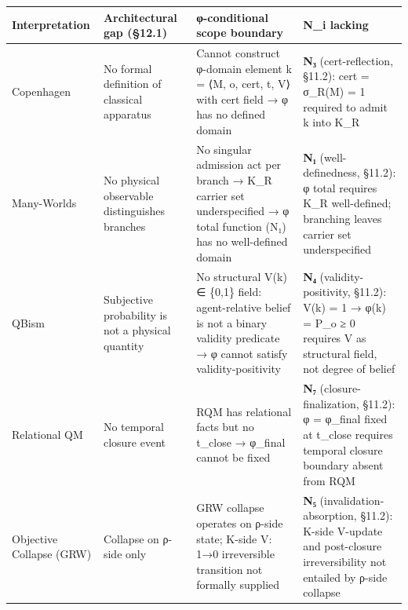 \documentclass[
  11pt,
]{article}
\newcounter{none} %
\begin{document}
{\def\LTcaptype{none} %
\begin{longtable}[]{@{}
  >{\raggedright\arraybackslash}p{}
  >{\raggedright\arraybackslash}p{}
  >{\raggedright\arraybackslash}p{}
  >{\raggedright\arraybackslash}p{}@{}}
\toprule\noalign{}
\begin{minipage}[b]{\linewidth}\raggedright
Interpretation
\end{minipage} & \begin{minipage}[b]{\linewidth}\raggedright
Architectural gap (§12.1)
\end{minipage} & \begin{minipage}[b]{\linewidth}\raggedright
φ-conditional scope boundary
\end{minipage} & \begin{minipage}[b]{\linewidth}\raggedright
N\_i lacking
\end{minipage} \\
\midrule\noalign{}
\endhead
\bottomrule\noalign{}
\endlastfoot
Copenhagen & No formal definition of classical apparatus & Cannot
construct φ-domain element k = ⟨M, o, cert, t, V⟩ with cert field → φ
has no defined domain & \textbf{N₃} (cert-reflection, §11.2): cert =
σ\_R(M) = 1 required to admit k into K\_R \\
Many-Worlds & No physical observable distinguishes branches & No
singular admission act per branch → K\_R carrier set underspecified → φ
total function (N₁) has no well-defined domain & \textbf{N₁}
(well-definedness, §11.2): φ total requires K\_R well-defined; branching
leaves carrier set underspecified \\
QBism & Subjective probability is not a physical quantity & No
structural V(k) ∈ \{0,1\} field: agent-relative belief is not a binary
validity predicate → φ cannot satisfy validity-positivity & \textbf{N₄}
(validity-positivity, §11.2): V(k) = 1 → φ(k) = P\_o ≥ 0 requires V as
structural field, not degree of belief \\
Relational QM & No temporal closure event & RQM has relational facts but
no t\_close → φ\_final cannot be fixed & \textbf{N₇}
(closure-finalization, §11.2): φ = φ\_final fixed at t\_close requires
temporal closure boundary absent from RQM \\
Objective Collapse (GRW) & Collapse on ρ-side only & GRW collapse
operates on ρ-side state; K-side V: 1→0 irreversible transition not
formally supplied & \textbf{N₅} (invalidation-absorption, §11.2): K-side
V-update and post-closure irreversibility not entailed by ρ-side
collapse \\
\end{longtable}
}
\end{document}

